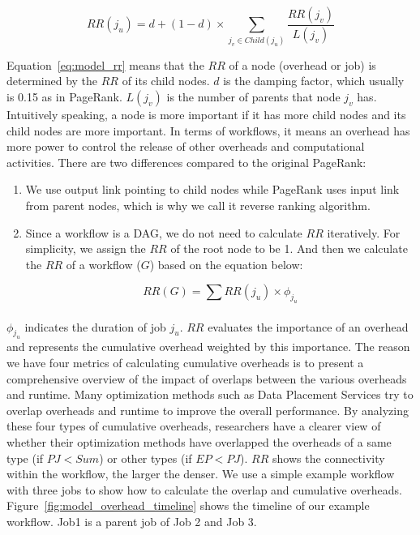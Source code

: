 \begin{equation} \label{eq:model_rr}
RR(j_u)=d+(1-d)\times\sum_{j_v\in Child(j_u)}{}\frac{RR(j_v)}{L(j_v)}
\end{equation}

Equation~\ref{eq:model_rr} means that the $RR$ of a node (overhead or job) is determined by the $RR$ of its child nodes. $d$ is the damping factor, which usually is 0.15 as in PageRank. $L(j_v)$ is the number of parents that node $j_v$ has. Intuitively speaking, a node is more important if it has more child nodes and its child nodes are more important. In terms of workflows, it means an overhead has more power to control the release of other overheads and computational activities. There are two differences compared to the original PageRank: 
\begin{enumerate}
\item We use output link pointing to child nodes while PageRank uses input link from parent nodes, which is why we call it reverse ranking algorithm.
\item Since a workflow is a DAG, we do not need to calculate $RR$ iteratively. For simplicity, we assign the $RR$ of the root node to be 1. And then we calculate the $RR$ of a workflow ($G$) based on the equation below:

\begin{equation} \label{eq:model_sum_rr}
RR(G)=\sum_{}{}RR(j_u) \times \phi_{j_u}
\end{equation}

\end{enumerate}
 
$\phi_{j_u}$ indicates the duration of job $j_u$.  $RR$ evaluates the importance of an overhead and represents the cumulative overhead weighted by this importance. 
The reason we have four metrics of calculating cumulative overheads is to present a comprehensive overview of the impact of overlaps between the various overheads and runtime. Many optimization methods such as Data Placement Services \cite{Amer2012} try to overlap overheads and runtime to improve the overall performance. By analyzing these four types of cumulative overheads, researchers have a clearer view of whether their optimization methods have overlapped the overheads of a same type (if $PJ < Sum$) or other types (if $EP < PJ$). $RR$ shows the connectivity within the workflow, the larger the denser. 
We use a simple example workflow with three jobs to show how to calculate the overlap and cumulative overheads. Figure~\ref{fig:model_overhead_timeline} shows the timeline of our example workflow. Job1 is a parent job of Job 2 and Job 3.

